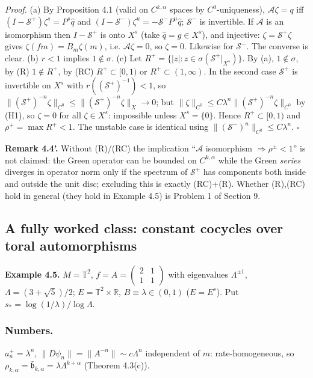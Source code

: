 \documentclass[11pt,a4paper]{article}
\theoremstyle{plain}
\theoremstyle{definition}
\theoremstyle{remark}
\numberwithin{equation}{section}
\numberwithin{figure}{section}
\begin{document}
\textit{Proof.} (a) By Proposition 4.1 (valid on $C^{k,\alpha}$ spaces by $C^0$-uniqueness), $\mathcal A\zeta=q$ iff $(I-\mathcal S^+)\zeta^s=P^s\hat q$ and $(I-\mathcal S^-)\zeta^u=-\mathcal S^-P^u\hat q$; $\mathcal S^-$ is invertible. If $\mathcal A$ is an isomorphism then $I-\mathcal S^+$ is onto $X^s$ (take $\hat q=g\in X^s$), and injective: $\zeta=\mathcal S^+\zeta$ gives $\zeta(fm)=B_m\zeta(m)$, i.e. $\mathcal A\zeta=0$, so $\zeta=0$. Likewise for $\mathcal S^-$. The converse is clear.
(b) $r<1$ implies $1\notin\sigma$.
(c) Let $R^+=\{|z|:z\in\sigma(\mathcal S^+|_{X^s})\}$. By (a), $1\notin\sigma$, by (R) $1\notin R^+$, by (RC) $R^+\subset[0,1)$ or $R^+\subset(1,\infty)$. In the second case $\mathcal S^+$ is invertible on $X^s$ with $r((\mathcal S^+)^{-1})<1$, so $\|(\mathcal S^+)^{-n}\zeta\|_{C^0}\le\|(\mathcal S^+)^{-n}\zeta\|_{X}\to0$; but $\|\zeta\|_{C^0}\le C\lambda^n\|(\mathcal S^+)^{-n}\zeta\|_{C^0}$ by (H1), so $\zeta=0$ for all $\zeta\in X^s$: impossible unless $X^s=\{0\}$. Hence $R^+\subset[0,1)$ and $\rho^+=\max R^+<1$. The unstable case is identical using $\|(\mathcal S^-)^n\|_{C^0}\le C\lambda^n$. $\square$

\textbf{Remark 4.4'.} Without (R)/(RC) the implication ``$\mathcal A$ isomorphism $\Rightarrow\rho^\pm<1$'' is not claimed: the Green operator can be bounded on $C^{k,\alpha}$ while the Green \textit{series} diverges in operator norm only if the spectrum of $\mathcal S^+$ has components both inside and outside the unit disc; excluding this is exactly (RC)+(R). Whether (R),(RC) hold in general (they hold in Example 4.5) is Problem 1 of Section 9.

\subsection{A fully worked class: constant cocycles over toral automorphisms}

\textbf{Example 4.5.} $M=\mathbb T^2$, $f=A=\begin{pmatrix}2&1\\1&1\end{pmatrix}$ with eigenvalues $\Lambda^{\pm1}$, $\Lambda=(3+\sqrt5)/2$; $E=\mathbb T^2\times\mathbb R$, $B\equiv\lambda\in(0,1)$ ($E=E^s$). Put $s_*=\log(1/\lambda)/\log\Lambda$.

\subsubsection{Numbers.} $a^+_n=\lambda^n$, $\|D\psi_n\|=\|A^{-n}\|\sim c\Lambda^n$ independent of $m$: rate-homogeneous, so $\rho_{k,\alpha}=\bar{\mathfrak b}_{k,\alpha}=\lambda\Lambda^{k+\alpha}$ (Theorem 4.3(c)).
\end{document}
